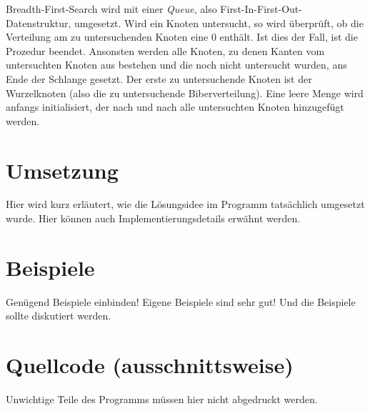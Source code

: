\documentclass[a4paper,10pt,ngerman]{scrartcl}
\begin{document}
Breadth-First-Search wird mit einer \textit{Queue}, also First-In-First-Out-Datenstruktur, umgesetzt.
Wird ein Knoten untersucht, so wird überprüft, ob die Verteilung am zu untersuchenden Knoten eine 0 enthält. Ist dies der Fall, ist die Prozedur beendet.
Ansonsten werden alle Knoten, zu denen Kanten vom untersuchten Knoten aus bestehen und die noch nicht untersucht wurden, ans Ende der Schlange gesetzt.
Der erste zu untersuchende Knoten ist der Wurzelknoten (also die zu untersuchende Biberverteilung).
Eine leere Menge wird anfangs initialisiert, der nach und nach alle untersuchten Knoten hinzugefügt werden.

\section{Umsetzung}
Hier wird kurz erläutert, wie die Lösungsidee im Programm tatsächlich umgesetzt wurde. Hier können auch Implementierungsdetails erwähnt werden.

\section{Beispiele}
Genügend Beispiele einbinden! Eigene Beispiele sind sehr gut! Und die Beispiele sollte diskutiert werden.

\section{Quellcode (ausschnittsweise)}
Unwichtige Teile des Programms müssen hier nicht abgedruckt werden.
\end{document}
